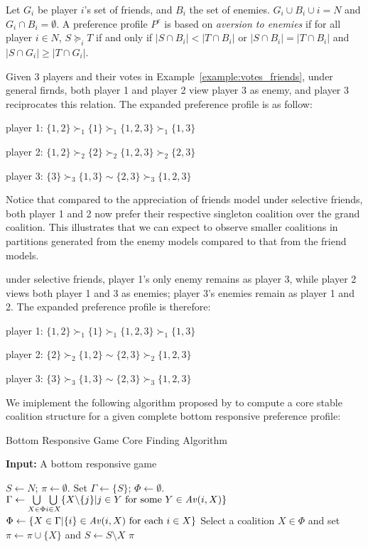 Let $G_i$ be player $i$'s set of friends, and $B_i$ the set of enemies.
$G_i \cup B_i \cup i = N$ and $G_i \cap B_i = \emptyset$.
A preference profile $P^e$ is based on \textit{aversion to enemies} if for all
player $i \in N$, $S \succeq_i T$ if and only if $|S \cap B_i| < |T \cap B_i|$
or $|S \cap B_i| = |T \cap B_i|$ and $|S \cap G_i| \geq |T \cap G_i|$.

Given 3 players and their votes in Example~\ref{example:votes_friends},
under general firnds, both player 1 and player 2 view player 3 as enemy, and
player 3 reciprocates this relation.
The expanded preference profile is as follow:

player 1: $\{1, 2\} \succ_1 \{1\} \succ_1 \{1, 2, 3\} \succ_1 \{1, 3\} $

player 2: $\{1, 2\} \succ_2 \{2\} \succ_2 \{1, 2, 3\} \succ_2 \{2, 3\}$

player 3: $\{3\} \succ_3 \{1, 3\} \sim \{2, 3\} \succ_3 \{1, 2, 3\}$

Notice that compared to the appreciation of friends model under selective
friends, both player 1 and 2 now prefer their respective singleton coalition
over the grand coalition.
This illustrates that we can expect to observe smaller coalitions in partitions
generated from the enemy models compared to that from the friend models.

under selective friends, player 1's only enemy remains as player 3, while
player 2 views both player 1 and 3 as enemies; player 3's enemies remain as
player 1 and 2.
The expanded preference profile is therefore:

player 1: $\{1, 2\} \succ_1 \{1\} \succ_1 \{1, 2, 3\} \succ_1 \{1, 3\} $

player 2: $\{2\} \succ_2 \{1, 2\} \sim \{2, 3\} \succ_2 \{1, 2, 3\} $

player 3: $\{3\} \succ_3 \{1, 3\} \sim \{2, 3\} \succ_3 \{1, 2, 3\}$

We imiplement the following algorithm proposed by  to
compute a core stable coalition structure for a given complete bottom
responsive preference profile:

\begin{algorithm}[htb]
  \caption{Bottom Responsive Game Core Finding Algorithm}
  \label{alg:bottom_responsive_core}
  \textbf{Input:} A bottom responsive game
  \begin{algorithmic}[1]

  \State $S \leftarrow N$; $\pi \leftarrow \emptyset$.
    \State Set $\Gamma \leftarrow \{S\}$; $\Phi \leftarrow \emptyset$.
    \While {$\Phi = \emptyset$}
      \State $\Gamma \leftarrow \underset{X \in \Phi}{\bigcup} \underset{i \in X}{\bigcup} \{ X \text{\textbackslash} \{j\} | j \in Y \text{ for some } Y \in \mathit{Av}(i, X)\}$
      \State $\Phi \leftarrow \lbrace X \in \Gamma | \{i\} \in \mathit{Av}(i, X) \text{ for each } i \in X \rbrace$
    \EndWhile
    \State Select a coalition $X \in \Phi$ and set
      $\pi \leftarrow \pi \cup \lbrace X \rbrace$ and
      $S \leftarrow  S \setminus X$
  \EndWhile
  \State \Return $\pi$

  \end{algorithmic}
\end{algorithm}

